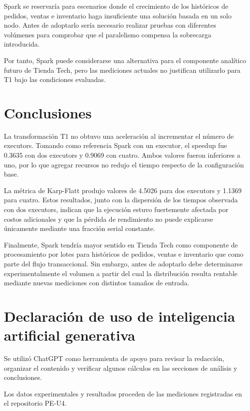 \documentclass[12pt,a4paper]{article}
\begin{document}
Spark se reservaría para escenarios donde el crecimiento de los históricos de
pedidos, ventas e inventario haga insuficiente una solución basada en un solo
nodo. Antes de adoptarlo sería necesario realizar pruebas con diferentes
volúmenes para comprobar que el paralelismo compensa la sobrecarga introducida.

Por tanto, Spark puede considerarse una alternativa para el componente
analítico futuro de Tienda Tech, pero las mediciones actuales no justifican
utilizarlo para T1 bajo las condiciones evaluadas.

\section{Conclusiones}

La transformación T1 no obtuvo una aceleración al incrementar el número de
executors. Tomando como referencia Spark con un executor, el speedup fue
\num{0.3635} con dos executors y \num{0.9069} con cuatro. Ambos valores fueron
inferiores a uno, por lo que agregar recursos no redujo el tiempo respecto de
la configuración base.

La métrica de Karp-Flatt produjo valores de \num{4.5026} para dos executors y
\num{1.1369} para cuatro. Estos resultados, junto con la dispersión de los
tiempos observada con dos executors, indican que la ejecución estuvo fuertemente
afectada por costos adicionales y que la pérdida de rendimiento no puede
explicarse únicamente mediante una fracción serial constante.

Finalmente, Spark tendría mayor sentido en Tienda Tech como componente de
procesamiento por lotes para históricos de pedidos, ventas e inventario que
como parte del flujo transaccional. Sin embargo, antes de adoptarlo debe
determinarse experimentalmente el volumen a partir del cual la distribución
resulta rentable mediante nuevas mediciones con distintos tamaños de entrada.

\section{Declaración de uso de inteligencia artificial generativa}

Se utilizó ChatGPT como herramienta de apoyo para revisar la redacción,
organizar el contenido y verificar algunos cálculos en las secciones de
análisis y conclusiones.

Los datos experimentales y resultados proceden de las mediciones registradas
en el repositorio PE-U4.

\printbibliography
\end{document}
